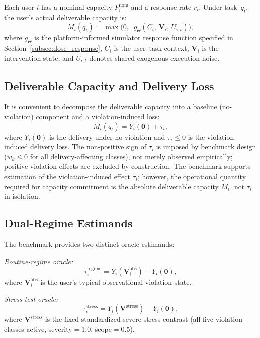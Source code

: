 \documentclass[utf8]{FrontiersinHarvard}
\begin{document}
Each user $i$ has a nominal capacity $P_i^{\mathrm{nom}}$ and a
response rate $r_i$. Under task~$q_t$, the user's actual
deliverable capacity is:
\begin{equation}
    M_i(q_t) = \max\!\bigl(0,\;\; g_\Theta(C_i,\,
    \mathbf{V}_i,\,     U_{i,t})\bigr),
\end{equation}
where $g_\Theta$ is the platform-informed simulator response
function specified in Section~\ref{subsec:dose_response},
$C_i$ is the user--task context, $\mathbf{V}_i$ is the
intervention state, and $U_{i,t}$ denotes shared exogenous execution
noise.

\subsection{Deliverable Capacity and Delivery Loss}

It is convenient to decompose the deliverable capacity into a
baseline (no-violation) component and a violation-induced loss:
\begin{equation}
    M_i(q_t) = Y_i(\mathbf{0}) + \tau_i,
\end{equation}
where $Y_i(\mathbf{0})$ is the delivery under no violation and
$\tau_i \leq 0$ is the violation-induced delivery loss.
The non-positive sign of $\tau_i$ is imposed by benchmark
design ($w_k \leq 0$ for all delivery-affecting classes),
not merely observed empirically; positive violation effects
are excluded by construction.
The
benchmark supports estimation of the violation-induced effect
$\tau_i$; however, the operational quantity required for
capacity commitment is the absolute deliverable capacity $M_i$,
not $\tau_i$ in isolation.

\subsection{Dual-Regime Estimands}

The benchmark provides two distinct oracle estimands:

\textit{Routine-regime oracle:}
\begin{equation}
    \tau_i^{\mathrm{regime}} = Y_i(\mathbf{V}_i^{\mathrm{obs}})
    - Y_i(\mathbf{0}),
\end{equation}
where $\mathbf{V}_i^{\mathrm{obs}}$ is the user's typical
observational violation state.

\textit{Stress-test oracle:}
\begin{equation}
    \tau_i^{\mathrm{stress}} = Y_i(\mathbf{V}^{\mathrm{stress}})
    - Y_i(\mathbf{0}),
\end{equation}
where $\mathbf{V}^{\mathrm{stress}}$ is the fixed standardized severe stress contrast
(all five violation classes active, severity$=$1.0, scope$=$0.5).
\end{document}

